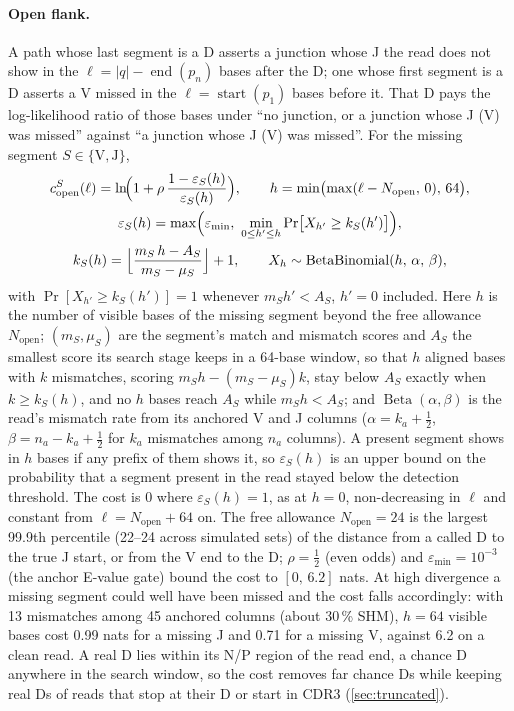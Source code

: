 \documentclass[11pt,a4paper]{article}
\begin{document}
\paragraph{Open flank.} A path whose last segment is a D asserts a junction
whose J the read does not show in the $\ell=|q|-\operatorname{end}(p_n)$
bases after the D; one whose first segment is a D asserts a V missed in the
$\ell=\operatorname{start}(p_1)$ bases before it. That D pays the
log-likelihood ratio of those bases under ``no junction, or a junction whose
J (V) was missed'' against ``a junction whose J (V) was missed''. For the
missing segment $S\in\{\mathrm V,\mathrm J\}$,
\begin{equation}
\begin{gathered}
  c^{S}_{\text{open}}(\ell) = \ln\!\Bigl(1 + \rho\,\frac{1-\varepsilon_S(h)}{\varepsilon_S(h)}\Bigr),
  \qquad h=\min\bigl(\max(\ell-N_{\text{open}},\,0),\,64\bigr),\\
  \varepsilon_S(h) = \max\Bigl(\varepsilon_{\min},\ \min_{0\le h'\le h}
     \Pr\bigl[X_{h'} \geq k_S(h')\bigr]\Bigr),\\
  k_S(h)=\Bigl\lfloor\frac{m_S\,h-A_S}{m_S-\mu_S}\Bigr\rfloor+1,
  \qquad X_{h} \sim \operatorname{BetaBinomial}(h,\,\alpha,\,\beta),
\end{gathered}
\label{eq:openflank}
\end{equation}
with $\Pr[X_{h'}\ge k_S(h')]=1$ whenever $m_S h'<A_S$, $h'=0$ included.
Here $h$ is the number of visible bases of the missing segment beyond the
free allowance $N_{\text{open}}$; $(m_S,\mu_S)$ are the segment's match and
mismatch scores and $A_S$ the smallest score its search stage keeps in a
64-base window, so that $h$ aligned bases with $k$ mismatches, scoring
$m_S h-(m_S-\mu_S)k$, stay below $A_S$ exactly when $k\ge k_S(h)$, and no
$h$ bases reach $A_S$ while $m_S h<A_S$; and $\operatorname{Beta}(\alpha,\beta)$
is the read's mismatch rate from its anchored V and J columns
($\alpha=k_a+\tfrac12$, $\beta=n_a-k_a+\tfrac12$ for $k_a$ mismatches among
$n_a$ columns). A present segment shows in $h$ bases if any prefix of them
shows it, so $\varepsilon_S(h)$ is an upper bound on the probability that a
segment present in the read stayed below the detection threshold. The cost
is 0 where $\varepsilon_S(h)=1$, as at $h=0$, non-decreasing in $\ell$ and
constant from $\ell=N_{\text{open}}+64$ on. The free allowance $N_{\text{open}}=24$ is
the largest 99.9th percentile (22--24 across simulated sets) of the distance
from a called D to the true J start, or from the V end to the D;
$\rho=\tfrac12$ (even odds) and $\varepsilon_{\min}=10^{-3}$ (the anchor
E-value gate) bound the cost to $[0,\,6.2]$ nats. At high divergence a
missing segment could well have been missed and the cost falls accordingly:
with 13 mismatches among 45 anchored columns (about 30\,\% SHM), $h=64$
visible bases cost 0.99 nats for a missing J and 0.71 for a missing V,
against 6.2 on a clean read. A real D lies within its N/P region of the read end, a chance D
anywhere in the search window, so the cost removes far chance Ds while
keeping real Ds of reads that stop at their D or start in CDR3
(\cref{sec:truncated}).
\end{document}

